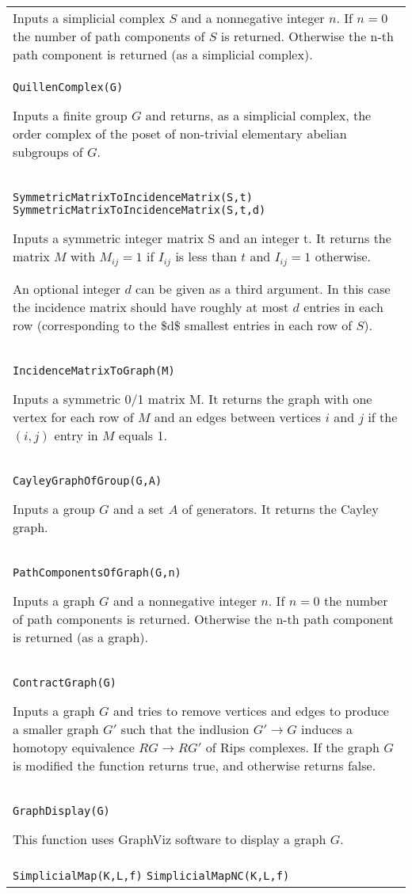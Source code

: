 \documentclass[a4paper,11pt]{report}
\begin{document}
{\begin{center}
\begin{tabular}{|l|}
 Inputs a simplicial complex $S$ and a nonnegative integer $n$. If $n=0$ the number of path components of $S$ is returned. Otherwise the n-th path component is returned (as a simplicial
complex). \\
 \index{QuillenComplex} \texttt{QuillenComplex(G)} 

 Inputs a finite group $G$ and returns, as a simplicial complex, the order complex of the poset of
non-trivial elementary abelian subgroups of $G$. \\
 \index{SymmetricMatrixToIncidenceMatrix} \texttt{SymmetricMatrixToIncidenceMatrix(S,t)} \texttt{SymmetricMatrixToIncidenceMatrix(S,t,d)} 

 Inputs a symmetric integer matrix S and an integer t. It returns the matrix $M$ with $M_{ij}=1$ if $I_{ij}$ is less than $ t$ and $I_{ij}=1$ otherwise. 

 An optional integer $d$ can be given as a third argument. In this case the incidence matrix should
have roughly at most $d$ entries in each row (corresponding to the \$d\$ smallest entries in each row
of $S$). \\
 \index{IncidenceMatrixToGraph} \texttt{IncidenceMatrixToGraph(M)} 

 Inputs a symmetric 0/1 matrix M. It returns the graph with one vertex for each
row of $M$ and an edges between vertices $i$ and $j$ if the $(i,j)$ entry in $M$ equals 1. \\
 \index{CayleyGraphOfGroup} \texttt{CayleyGraphOfGroup(G,A)} 

 Inputs a group $G$ and a set $A$ of generators. It returns the Cayley graph. \\
 \index{PathComponentsOfGraph} \texttt{PathComponentsOfGraph(G,n)} 

 Inputs a graph $G$ and a nonnegative integer $n$. If $n=0$ the number of path components is returned. Otherwise the n-th path component
is returned (as a graph). \\
 \index{ContractGraph} \texttt{ContractGraph(G)} 

 Inputs a graph $G$ and tries to remove vertices and edges to produce a smaller graph $G'$ such that the indlusion $G' \rightarrow G$ induces a homotopy equivalence $RG \rightarrow RG'$ of Rips complexes. If the graph $G$ is modified the function returns true, and otherwise returns false. \\
 \index{GraphDisplay} \texttt{GraphDisplay(G)} 

 This function uses GraphViz software to display a graph $G$. \\
 \index{SimplicialMap} \index{SimplicialMapNC} \texttt{SimplicialMap(K,L,f)} \texttt{SimplicialMapNC(K,L,f)} 


\end{tabular}
\end{center}}
\end{document}
